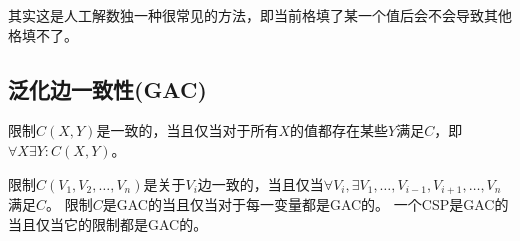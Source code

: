 其实这是人工解数独一种很常见的方法，即当前格填了某一个值后会不会导致其他格填不了。

\subsection{泛化边一致性(GAC)}
\begin{definition}[一致]
限制$C(X,Y)$是一致的，当且仅当对于所有$X$的值都存在某些$Y$满足$C$，即$\forall X\exists Y:C(X,Y)$。
\end{definition}
\begin{definition}
限制$C(V_1,V_2,\ldots,V_n)$是关于$V_i$边一致的，当且仅当$\forall V_i,\exists V_1,\ldots,V_{i-1},V_{i+1},\ldots,V_n$满足$C$。
限制$C$是GAC的当且仅当对于每一变量都是GAC的。
一个CSP是GAC的当且仅当它的限制都是GAC的。
\end{definition}

